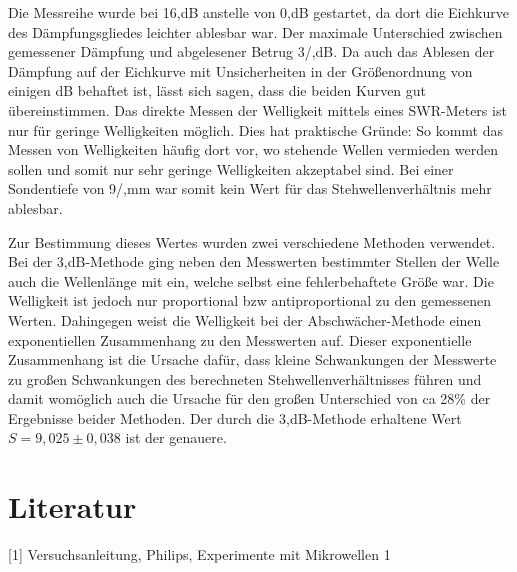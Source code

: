 Die Messreihe wurde bei 16,dB anstelle von 0,dB gestartet, da dort die Eichkurve des Dämpfungsgliedes leichter ablesbar war.
Der maximale Unterschied zwischen gemessener Dämpfung und abgelesener Betrug 3/,dB.
Da auch das Ablesen der Dämpfung auf der Eichkurve mit Unsicherheiten in der Größenordnung von einigen dB behaftet ist, lässt sich sagen, dass die beiden Kurven gut übereinstimmen.
Das direkte Messen der Welligkeit mittels eines SWR-Meters ist nur  für geringe Welligkeiten möglich.
Dies hat praktische Gründe:
So kommt das Messen von Welligkeiten häufig dort vor, wo stehende Wellen vermieden werden sollen und somit nur sehr geringe Welligkeiten akzeptabel sind.
Bei einer Sondentiefe von 9/,mm war somit kein Wert für das Stehwellenverhältnis mehr ablesbar.

Zur Bestimmung dieses Wertes wurden zwei verschiedene Methoden verwendet.
Bei der 3,dB-Methode ging neben den Messwerten bestimmter Stellen der Welle auch die Wellenlänge mit ein, welche selbst eine fehlerbehaftete Größe war.
Die Welligkeit ist jedoch nur proportional bzw antiproportional zu den gemessenen Werten.
Dahingegen weist die Welligkeit bei der Abschwächer-Methode einen exponentiellen Zusammenhang zu den Messwerten auf.
Dieser exponentielle Zusammenhang ist die Ursache dafür, dass kleine Schwankungen der Messwerte zu großen Schwankungen des berechneten Stehwellenverhältnisses führen und damit womöglich auch die Ursache für den großen Unterschied von ca 28\% der Ergebnisse beider Methoden.
Der durch die 3,dB-Methode erhaltene Wert $S = 9,025 \pm 0,038$ ist der genauere.

\section{Literatur}
[1] Versuchsanleitung, Philips, Experimente mit Mikrowellen 1
























